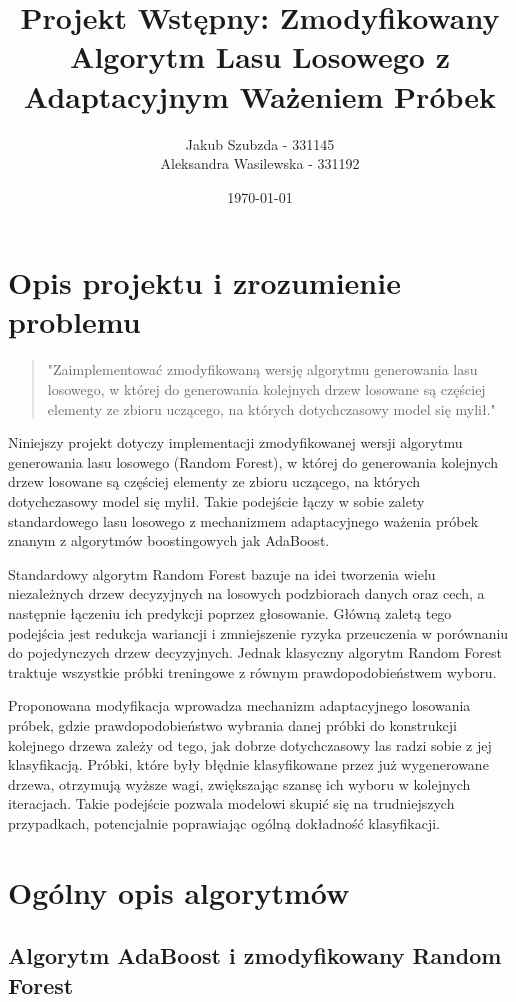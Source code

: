 \documentclass[11pt,a4paper]{article}
\title{Projekt Wstępny: Zmodyfikowany Algorytm Lasu Losowego z Adaptacyjnym Ważeniem Próbek}
\author{Jakub Szubzda - 331145 \\ Aleksandra Wasilewska - 331192}
\date{\today}
\begin{document}
\maketitle
\tableofcontents
\newpage

\section{Opis projektu i zrozumienie problemu}
\begin{quote}
"Zaimplementować zmodyfikowaną wersję algorytmu generowania lasu losowego,
w której do generowania kolejnych drzew losowane są częściej elementy
ze zbioru uczącego, na których dotychczasowy model się mylił."
\end{quote}

Niniejszy projekt dotyczy implementacji zmodyfikowanej wersji algorytmu generowania lasu losowego (Random Forest), w której do generowania kolejnych drzew losowane są częściej elementy ze zbioru uczącego, na których dotychczasowy model się mylił. Takie podejście łączy w sobie zalety standardowego lasu losowego z mechanizmem adaptacyjnego ważenia próbek znanym z algorytmów boostingowych jak AdaBoost.

Standardowy algorytm Random Forest bazuje na idei tworzenia wielu niezależnych drzew decyzyjnych na losowych podzbiorach danych oraz cech, a następnie łączeniu ich predykcji poprzez głosowanie. Główną zaletą tego podejścia jest redukcja wariancji i zmniejszenie ryzyka przeuczenia w porównaniu do pojedynczych drzew decyzyjnych. Jednak klasyczny algorytm Random Forest traktuje wszystkie próbki treningowe z równym prawdopodobieństwem wyboru.

Proponowana modyfikacja wprowadza mechanizm adaptacyjnego losowania próbek, gdzie prawdopodobieństwo wybrania danej próbki do konstrukcji kolejnego drzewa zależy od tego, jak dobrze dotychczasowy las radzi sobie z jej klasyfikacją. Próbki, które były błędnie klasyfikowane przez już wygenerowane drzewa, otrzymują wyższe wagi, zwiększając szansę ich wyboru w kolejnych iteracjach. Takie podejście pozwala modelowi skupić się na trudniejszych przypadkach, potencjalnie poprawiając ogólną dokładność klasyfikacji.

\section{Ogólny opis algorytmów}

\subsection{Algorytm AdaBoost i zmodyfikowany Random Forest}
\end{document}
